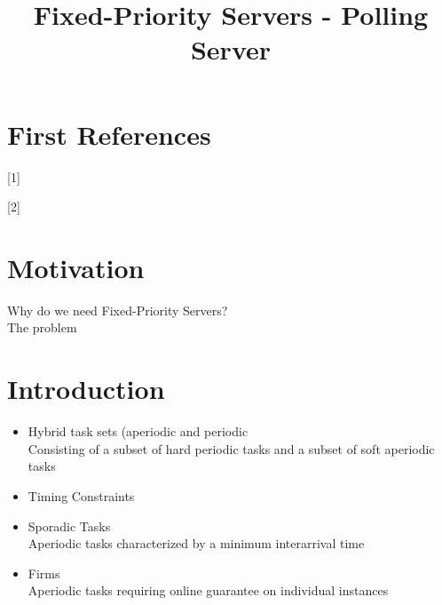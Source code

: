 \documentclass[conference]{IEEEtran}
\begin{document}
\title{Fixed-Priority Servers - Polling Server\\
}

\author{

}

\maketitle

\begin{abstract}

\end{abstract}

\begin{IEEEkeywords}

\end{IEEEkeywords}

\section{First References}
[1]\cite{davis2005hierarchical} 

[2]\cite{buttazzo2011hard}

\section {Motivation}
Why do we need Fixed-Priority Servers?\\
The problem\\

\section{Introduction}

\begin{itemize}
\item Hybrid task sets (aperiodic and periodic\\
Consisting of a subset of hard periodic tasks and a subset of soft aperiodic tasks\\
\item Timing Constraints\\
\item Sporadic Tasks\\
Aperiodic tasks characterized by a minimum interarrival time\\
\item Firms\\
Aperiodic tasks requiring online guarantee on individual instances
\end{itemize}
\end{document}
